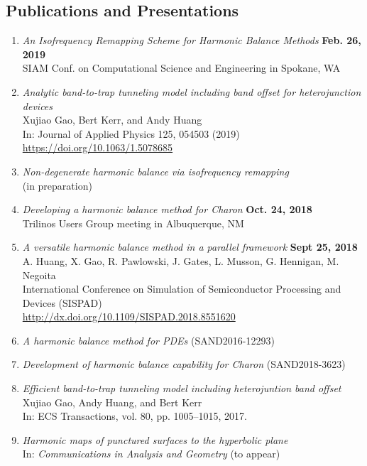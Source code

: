 \documentclass[margin,line]{res}
\begin{document}
\begin{resume}
\section{\sc Publications and Presentations}
\begin{enumerate}
\item \emph{An Isofrequency Remapping Scheme for Harmonic Balance Methods} \hfill{\bf Feb. 26, 2019}\\
      SIAM Conf. on Computational Science and Engineering in Spokane, WA
\item \emph{Analytic band-to-trap tunneling model including band offset for heterojunction devices}\\
      Xujiao Gao, Bert Kerr, and Andy Huang\\
      In: Journal of Applied Physics 125, 054503 (2019)\\
      \url{https://doi.org/10.1063/1.5078685}
\item \emph{Non-degenerate harmonic balance via isofrequency remapping}\\
      (in preparation)
\item \emph{Developing a harmonic balance method for Charon}  \hfill {\bf Oct. 24, 2018}\\
      Trilinos Users Group meeting in Albuquerque, NM
\item \emph{A versatile harmonic balance method in a parallel framework} \hfill {\bf Sept 25, 2018}\\
      A. Huang, X. Gao, R. Pawlowski, J. Gates, L. Musson, G. Hennigan, M. Negoita\\
      International Conference on Simulation of Semiconductor Processing and Devices (SISPAD)\\
      \url{http://dx.doi.org/10.1109/SISPAD.2018.8551620}
\item \emph{A harmonic balance method for PDEs} (SAND2016-12293)
\item \emph{Development of harmonic balance capability for Charon} (SAND2018-3623)
\item {\em Efficient band-to-trap tunneling model including heterojuntion band offset}\\
      Xujiao Gao, Andy Huang, and Bert Kerr\\
      In: ECS Transactions, vol. 80, pp. 1005–1015, 2017.
\item {\em Harmonic maps of punctured surfaces to the hyperbolic plane} \\%
      In: {\em Communications in Analysis and Geometry} (to appear) \\

\end{enumerate}
\end{resume}
\end{document}
